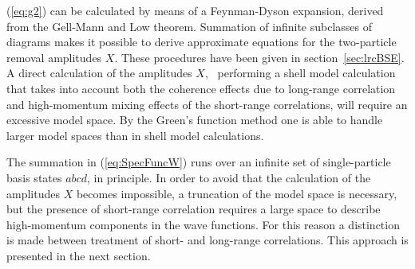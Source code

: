 (\ref{eq:g2}) can be calculated by means of a Feynman-Dyson expansion, 
derived from the Gell-Mann and Low theorem\cite{FW71,AGD63}. 
Summation of infinite subclasses 
of diagrams makes
it possible to derive approximate equations for the two-particle
removal amplitudes $X$. 
These procedures have been given in section~\ref{sec:lrcBSE}.
%
A direct calculation of the amplitudes $X$, \ie\ performing a shell model 
calculation that takes into account both the coherence effects due to 
long-range correlation and high-momentum mixing effects of the short-range
correlations, will require an excessive model space. By the Green's function 
method one is able to handle larger model spaces than in shell model
calculations. 
%

The summation in (\ref{eq:SpecFuncW}) runs over an infinite set of 
single-particle basis states $abcd$, in principle. 
In order to avoid that the calculation of the amplitudes $X$ becomes impossible,
a truncation of the model space is 
necessary, but the presence of short-range correlation requires a large 
space to describe high-momentum components in the wave functions. 
For this reason a distinction is made between treatment of short- and 
long-range correlations. This approach is presented in the next section.
